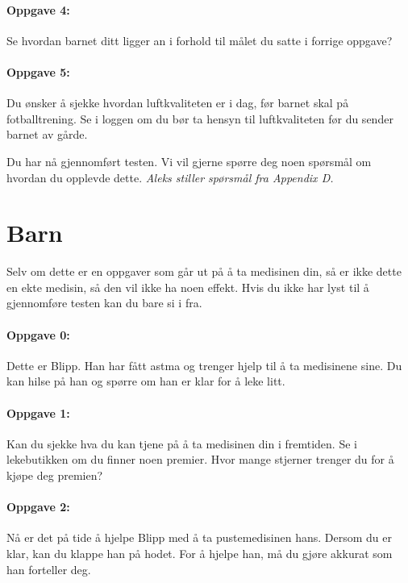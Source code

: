 \paragraph{Oppgave 4:}
Se hvordan barnet ditt ligger an i forhold til m\r{a}let du satte i forrige oppgave?


\paragraph{Oppgave 5:}
Du \o  nsker \r{a} sjekke hvordan luftkvaliteten er i dag, f\o r barnet skal p\r{a} fotballtrening. Se i loggen om du b\o r ta hensyn til luftkvaliteten f\o r du sender barnet av g\r{a}rde.  

 
Du har n\r{a} gjennomf\o rt testen. Vi vil gjerne sp\o rre deg noen sp\o rsm\r{a}l om hvordan du opplevde dette. \emph{Aleks stiller sp\o rsm\r{a}l fra Appendix D.}

\section{Barn}

Selv om dette er en oppgaver som g\r{a}r ut p\r{a} \r{a} ta medisinen din, s\r{a} er ikke dette en ekte medisin, s\r{a} den vil ikke ha noen effekt. Hvis du ikke har lyst til \r{a} gjennomf\o re testen kan du bare si i fra. 
 
\paragraph{Oppgave 0:}
Dette er Blipp. Han har f\r{a}tt astma og trenger hjelp til \r{a} ta medisinene sine. Du kan hilse p\r{a}  han og sp\o rre om han er klar for \r{a} leke litt. 

\paragraph{Oppgave 1:}
Kan du sjekke hva du kan tjene p\r{a}  \r{a}  ta medisinen din i fremtiden. Se i lekebutikken om du finner noen premier. Hvor mange stjerner trenger du for \r{a} kj\o pe deg premien?

\paragraph{Oppgave 2:}
N\r{a}  er det p\r{a}  tide \r{a}  hjelpe Blipp med \r{a}  ta pustemedisinen hans. Dersom du er klar, kan du klappe han p\r{a}  hodet. For \r{a}  hjelpe han, m\r{a}  du gj\o re akkurat som han forteller deg.  

